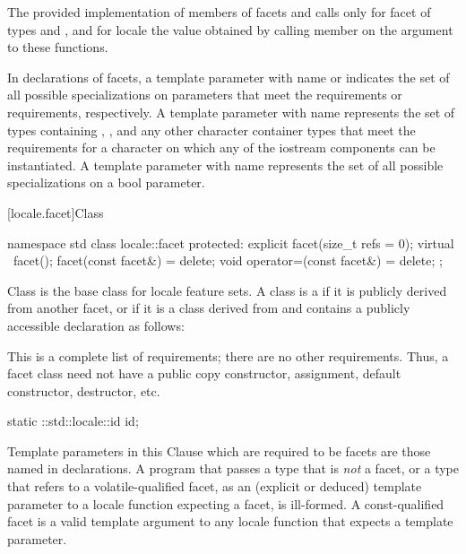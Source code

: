 \pnum
The provided implementation of members of
facets  and 
calls  only for facet  of
types  and ,
and for locale  the value obtained by calling member 
on the  argument to these functions.

\pnum
In declarations of facets,
a template parameter with name  or 
indicates the set of all possible specializations on parameters that meet the
 requirements or
 requirements,
respectively.
A template parameter with name  represents
the set of types containing , , and any other
character container types
that meet the requirements for a character
on which any of the iostream components can be instantiated.
A template parameter with name 
represents the set of all possible specializations on a bool parameter.

[locale.facet]{Class }

%
\begin{codeblock}
namespace std {
  class locale::facet {
  protected:
    explicit facet(size_t refs = 0);
    virtual ~facet();
    facet(const facet&) = delete;
    void operator=(const facet&) = delete;
  };
}
\end{codeblock}

\pnum
Class  is the base class for locale feature sets.
A class is a 
if it is publicly derived from another facet, or
if it is a class derived from  and
contains a publicly accessible declaration as follows:
\begin{footnote}
This is a complete list of requirements; there are no other requirements.
Thus, a facet class need not have a public
copy constructor, assignment, default constructor, destructor, etc.
\end{footnote}
\begin{codeblock}
static ::std::locale::id id;
\end{codeblock}

\pnum
Template parameters in this Clause
which are required to be facets
are those named  in declarations.
A program that passes
a type that is \textit{not} a facet, or
a type that refers to a volatile-qualified facet,
as an (explicit or deduced) template parameter to
a locale function expecting a facet,
is ill-formed.
A const-qualified facet is a valid template argument to
any locale function that expects a  template parameter.

